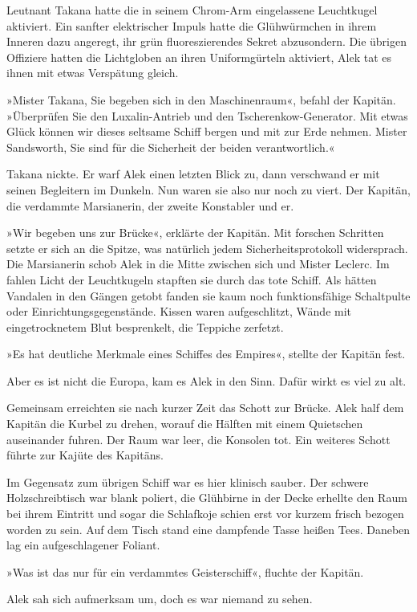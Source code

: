 Leutnant Takana hatte die in seinem Chrom-Arm eingelassene
Leuchtkugel aktiviert. Ein sanfter elektrischer Impuls hatte die
Glühwürmchen in ihrem Inneren dazu angeregt, ihr grün
fluoreszierendes Sekret abzusondern. Die übrigen Offiziere hatten
die Lichtgloben an ihren Uniformgürteln aktiviert, Alek tat es
ihnen mit etwas Verspätung gleich.

»Mister Takana, Sie begeben sich in den Maschinenraum«, befahl der
Kapitän. »Überprüfen Sie den Luxalin-Antrieb und den
Tscheren\-kow-Generator. Mit etwas Glück können wir dieses seltsame
Schiff bergen und mit zur Erde nehmen. Mister Sandsworth, Sie sind
für die Sicherheit der beiden verantwortlich.«

Takana nickte. Er warf Alek einen letzten Blick zu, dann verschwand
er mit seinen Begleitern im Dunkeln. Nun waren sie also nur noch zu
viert. Der Kapitän, die verdammte Marsianerin, der zweite
Konstabler und er.

»Wir begeben uns zur Brücke«, erklärte der Kapitän. Mit forschen
Schritten setzte er sich an die Spitze, was natürlich jedem
Sicherheitsprotokoll widersprach. Die Marsianerin schob Alek in die
Mitte zwischen sich und Mister Leclerc. Im fahlen Licht der
Leuchtkugeln stapften sie durch das tote Schiff. Als hätten
Vandalen in den Gängen getobt fanden sie kaum noch funktionsfähige
Schaltpulte oder Einrichtungsgegenstände. Kissen waren
aufgeschlitzt, Wände mit eingetrocknetem Blut besprenkelt, die
Teppiche zerfetzt.

»Es hat deutliche Merkmale eines Schiffes des Empires«, stellte der
Kapitän fest.

Aber es ist nicht die Europa, kam es Alek in den Sinn. Dafür wirkt
es viel zu alt.

Gemeinsam erreichten sie nach kurzer Zeit das Schott zur Brücke.
Alek half dem Kapitän die Kurbel zu drehen, worauf die Hälften mit
einem Quietschen auseinander fuhren. Der Raum war leer, die
Konsolen tot. Ein weiteres Schott führte zur Kajüte des Kapitäns.

Im Gegensatz zum übrigen Schiff war es hier klinisch sauber. Der
schwere Holzschreibtisch war blank poliert, die Glühbirne in der
Decke erhellte den Raum bei ihrem Eintritt und sogar die Schlafkoje
schien erst vor kurzem frisch bezogen worden zu sein. Auf dem Tisch
stand eine dampfende Tasse heißen Tees. Daneben lag ein
aufgeschlagener Foliant.

»Was ist das nur für ein verdammtes Geisterschiff«, fluchte der
Kapitän.

Alek sah sich aufmerksam um, doch es war niemand zu sehen.

